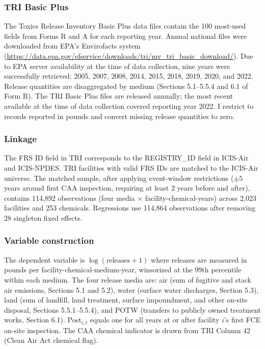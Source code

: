 \documentclass[12pt]{article}
\begin{document}
\subsubsection*{TRI Basic Plus} The Toxics Release Inventory Basic Plus data files contain the 100 most-used fields from Forms R and A for each reporting year. Annual national files were downloaded from EPA's Envirofacts system (\url{https://data.epa.gov/efservice/downloads/tri/mv_tri_basic_download/}). Due to EPA server availability at the time of data collection, nine years were successfully retrieved: 2005, 2007, 2008, 2014, 2015, 2018, 2019, 2020, and 2022. Release quantities are disaggregated by medium (Sections 5.1--5.5.4 and 6.1 of Form R). The TRI Basic Plus files are released annually; the most recent available at the time of data collection covered reporting year 2022. I restrict to records reported in pounds and convert missing release quantities to zero.

\subsubsection*{Linkage} The FRS ID field in TRI corresponds to the REGISTRY\_ID field in ICIS-Air and ICIS-NPDES. TRI facilities with valid FRS IDs are matched to the ICIS-Air universe. The matched sample, after applying event-window restrictions ($\pm 5$ years around first CAA inspection, requiring at least 2 years before and after), contains 114,892 observations (four media $\times$ facility-chemical-years) across 2,023 facilities and 253 chemicals. Regressions use 114,864 observations after removing 28 singleton fixed effects.

\subsubsection*{Variable construction} The dependent variable is $\log(\text{releases} + 1)$ where releases are measured in pounds per facility-chemical-medium-year, winsorized at the 99th percentile within each medium. The four release media are: air (sum of fugitive and stack air emissions, Sections 5.1 and 5.2), water (surface water discharges, Section 5.3), land (sum of landfill, land treatment, surface impoundment, and other on-site disposal, Sections 5.5.1--5.5.4), and POTW (transfers to publicly owned treatment works, Section 6.1). Post$_{i,t}$ equals one for all years at or after facility $i$'s first FCE on-site inspection. The CAA chemical indicator is drawn from TRI Column 42 (Clean Air Act chemical flag).
\end{document}

